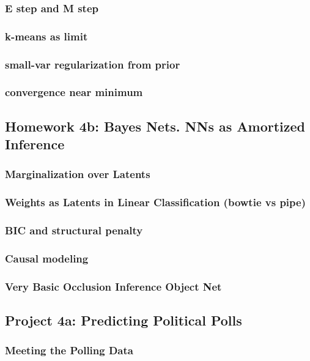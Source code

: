 \documentclass[12pt]{article}
\begin{document}
      \subsubsection*{E step and M step}
      \subsubsection*{k-means as limit}
      \subsubsection*{small-var regularization from prior}
      \subsubsection*{convergence near minimum}
    \newpage

    \subsection*{Homework 4b: Bayes Nets.  NNs as Amortized Inference}
      \subsubsection*{Marginalization over Latents}
      \subsubsection*{Weights as Latents in Linear Classification (bowtie vs pipe)}
      \subsubsection*{BIC and structural penalty}
      \subsubsection*{Causal modeling}
      \subsubsection*{Very Basic Occlusion Inference Object Net}
    \newpage

    \subsection*{Project 4a: Predicting Political Polls}
      \subsubsection*{Meeting the Polling Data}
\end{document}
